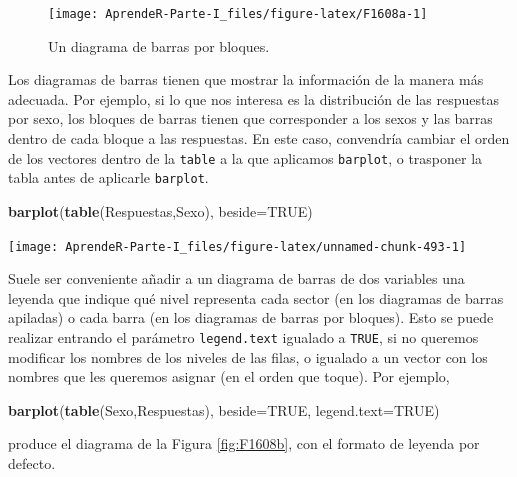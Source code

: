 \documentclass[]{book}
\newenvironment{Shaded}{\begin{snugshade}}{\end{snugshade}}
\newcommand{\DataTypeTok}[1]{\textcolor[rgb]{0.13,0.29,0.53}{#1}}
\newcommand{\KeywordTok}[1]{\textcolor[rgb]{0.13,0.29,0.53}{\textbf{#1}}}
\newcommand{\NormalTok}[1]{#1}
\newcommand{\OtherTok}[1]{\textcolor[rgb]{0.56,0.35,0.01}{#1}}
\theoremstyle{definition}
\theoremstyle{definition}
\theoremstyle{definition}
\theoremstyle{remark}
\begin{document}
\begin{figure}

{\centering \texttt{[image: AprendeR-Parte-I\_files/figure-latex/F1608a-1]} 

}

\caption{Un diagrama de barras por bloques.}\label{fig:F1608a}
\end{figure}

Los diagramas de barras tienen que mostrar la información de la manera más adecuada. Por ejemplo, si lo que nos interesa es la distribución de las respuestas por sexo, los bloques de barras tienen que corresponder a los sexos y las barras dentro de cada bloque a las respuestas. En este caso, convendría cambiar el orden de los vectores dentro de la \texttt{table} a la que aplicamos \texttt{barplot}, o trasponer la tabla antes de aplicarle \texttt{barplot}.

\begin{Shaded}
\begin{Highlighting}[]
\KeywordTok{barplot}\NormalTok{(}\KeywordTok{table}\NormalTok{(Respuestas,Sexo), }\DataTypeTok{beside=}\OtherTok{TRUE}\NormalTok{)}
\end{Highlighting}
\end{Shaded}

\begin{center}\texttt{[image: AprendeR-Parte-I\_files/figure-latex/unnamed-chunk-493-1]} \end{center}

Suele ser conveniente añadir a un diagrama de barras de dos variables una leyenda que indique qué nivel representa cada sector (en los diagramas de barras apiladas) o cada barra (en los diagramas de barras por bloques). Esto se puede realizar entrando el parámetro \texttt{legend.text} igualado a \texttt{TRUE}, si no queremos modificar los nombres de los niveles de las filas, o igualado a un vector con los nombres que les queremos asignar (en el orden que toque).
Por ejemplo,

\begin{Shaded}
\begin{Highlighting}[]
\KeywordTok{barplot}\NormalTok{(}\KeywordTok{table}\NormalTok{(Sexo,Respuestas), }\DataTypeTok{beside=}\OtherTok{TRUE}\NormalTok{, }\DataTypeTok{legend.text=}\OtherTok{TRUE}\NormalTok{)}
\end{Highlighting}
\end{Shaded}

produce el diagrama de la Figura \ref{fig:F1608b}, con el formato de leyenda por defecto.
\end{document}
